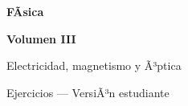 ﻿\documentclass[11pt,letterpaper,openany]{book}
\newcommand{\rutaraiz}{../..}
\newcommand{\numerovolumen}{III}
\newcommand{\nombrevolumen}{Electricidad, magnetismo y Ã³ptica}
\begin{document}

\begin{titlepage}

    \centering

    \vspace*{2.5cm}

    {\color{RojoPrincipal}
    \Huge\bfseries
    FÃ­sica
    \par}

    \vspace{0.8cm}

    {\color{AzulPrincipal}
    \LARGE\bfseries
    Volumen \numerovolumen
    \par}

    \vspace{0.5cm}

    {\Large
    \nombrevolumen
    \par}

    \vspace{1.5cm}

    {\color{AzulPrincipal}
    \Large
    Ejercicios --- VersiÃ³n estudiante
    \par}

    \vfill

    {\Large\bfseries
    \autorlibro
    \par}

    \vspace{2cm}

\end{titlepage}



\frontmatter

\tableofcontents

\cleardoublepage



\mainmatter

%
%
%
%
%
%
%
%
% 
\end{document}
